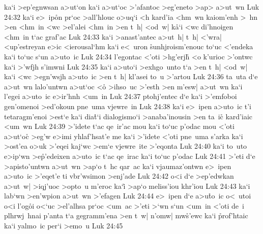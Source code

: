 ka`i
>ep'egnwsan
a>ut`on
ka`i
a>ut`oc
>'afantoc
>eg'eneto
>ap>
a>ut~wn\bibvsend
\vs Luk 24:32
ka`i
e>~ip\r{o}n
pr`oc
>all'hlouc
o>uq`i
<h
kard'ia
<hm~wn
kaiom'enh
>~hn
>en
<hm~in
<wc
>el'alei
<hm~in
>en
t~h|
<od~w|
k\r{a}`i
<wc
di'hnoigen
<hm~in
t`ac
graf'ac\bibvsend
\vs Luk 24:33
ka`i
>anast'antec
a>ut~h|
t~h|
<'wra|
<up'estreyan
e>ic
<ierousal`hm
ka`i
e<~uron
\r{s}unhjroism'enouc
to`uc
<'endeka
ka`i
to`uc
s`un
a>uto~ic\bibvsend
\vs Luk 24:34
l'egontac
<'oti
>hg'erjh\r{}
<o
k'urioc
>'ontwc
ka`i
>'wfjh
s'imwni\bibvsend
\vs Luk 24:35
ka`i
a>uto`i
>exhgo~unto
t`a
>en
t~h|
<od~w|
ka`i
<wc
>egn'wsjh
a>uto~ic
>en
t~h|
kl'asei
to~u
>'artou\bibvsend
\vs Luk 24:36
ta~uta
d`e
a>ut~wn
lalo'untwn
a>ut`oc
<o\r{}
>ihso~uc
>'esth
>en
m'esw|
a>ut~wn
ka`i
l'egei
a>uto~ic
e>ir'hnh
<um~in\bibvsend
\vs Luk 24:37
ptohj'entec
d`e
ka`i
>'emfoboi
gen'omenoi
>ed'okoun
pne~uma
vjewre~in\bibvsend
\vs Luk 24:38
ka`i
e>~ipen
a>uto~ic
t'i
tetaragm'enoi
>est`e
ka`i
dia\r{t}`i
dialogismo`i
>anaba'inousin
>en
ta~ic\r{}
kard'iaic
<um~wn\bibvsend
\vs Luk 24:39
>'idete
t`ac
qe~ir'ac
mou
ka`i
to`uc
p'odac
mou
<'oti
a>ut`oc\r{}
>eg'w
e>imi
yhlaf'hsat'e
me
ka`i
>'idete
<'oti
pne~uma
s'arka
ka`i
>ost'ea
o>uk
>'eqei
kaj`wc
>em`e
vjewre~ite
>'eqonta\bibvsend
\vs Luk 24:40
ka`i
to~uto
e>ip`wn
>e\r{p}'edeixen
a>uto~ic
t`ac
qe~irac
ka`i
to`uc
p'odac\bibvsend
\vs Luk 24:41
>'eti
d`e
>apisto'untwn
a>ut~wn
>ap`o
t~hc
qar~ac
ka`i
vjaumaz'ontwn
e>~ipen
a>uto~ic
>'eqet'e
ti
vbr'wsimon
>enj'ade\bibvsend
\vs Luk 24:42
o<i
d`e
>ep'edwkan
a>ut~w|
>iqj'uoc
>opto~u
m'eroc
ka`i\r{}
>ap`o
meliss'iou
khr'iou\bibvsend
\vs Luk 24:43
ka`i
lab`wn
>en'wpion
a>ut~wn
>'efagen\bibvsend
\vs Luk 24:44
e>~ipen
d`e
a>u\r{t}o~ic
o<~utoi
o<i
l'og\r{o}i
o<`uc
>el'alhsa
pr`oc
<um~ac
>'eti
>`wn
s`un
<um~in
<'oti
de~i
plhrwj~hnai
p'anta
t`a
gegramm'ena
>en
t~w|
n'omw|
mw\r{s}'ewc
ka`i
\r{p}rof'htaic
ka`i
yalmo~ic
per`i
>emo~u\bibvsend
\vs Luk 24:45
